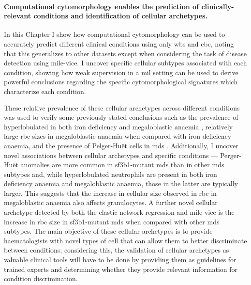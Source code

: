 \paragraph{Computational cytomorphology enables the prediction of clinically-relevant conditions and identification of cellular archetypes.} In this Chapter I show how computational cytomorphology can be used to accurately predict different clinical conditions using only \ac{wbs} and \ac{cbc}, noting that this generalizes to other datasets except when considering the task of disease detection using \ac{mile-vice}. I uncover specific cellular subtypes associated with each condition, showing how weak supervision in a \ac{mil} setting can be used to derive powerful conclusions regarding the specific cytomorphological signatures which characterize each condition. 

These relative prevalence of these cellular archetypes across different conditions was used to verify some previously stated conclusions such as the prevalence of hyperlobulated in both iron deficiency and megaloblastic anaemia \cite{Lindenbaum1980 -ux,Westerman1999-gs}, relatively large \ac{rbc} sizes in megaloblastic anaemia when compared with iron deficiency anaemia, and the presence of Pelger-Huët cells in \ac{mds} \cite{Colella2012-so}. Additionally, I uncover novel associations between cellular archetypes and specific conditions --- Perger-Huët anomalies are more common in \ac{sf3b1}-mutant \ac{mds} than in other \ac{mds} subtypes and, while hyperlobulated neutrophils are present in both iron deficiency anaemia and megaloblastic anaemia, those in the latter are typically larger. This suggests that the increase in cellular size observed in \ac{rbc} in megaloblastic anaemia also affects granulocytes. A further novel cellular archetype detected by both the elastic network regression and \ac{mile-vice} is the increase in \ac{rbc} size in \ac{sf3b1}-mutant \ac{mds} when compared with other \ac{mds} subtypes. The main objective of these cellular archetypes is to provide haematologists with novel types of cell that can allow them to better discriminate between conditions; considering this, the validation of cellular archetypes as valuable clinical tools will have to be done by providing them as guidelines for trained experts and determining whether they provide relevant information for condition discrimination.

